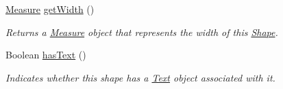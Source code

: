 \begin{DoxyCompactItemize}
\hyperlink{classcom_1_1aarrelaakso_1_1drawl_1_1_measure}{Measure} \hyperlink{classcom_1_1aarrelaakso_1_1drawl_1_1_shape_a3e2c58984f1bcbc2e9e86cf30868561e}{get\+Width} ()
\begin{DoxyCompactList}\small\item\em Returns a \hyperlink{classcom_1_1aarrelaakso_1_1drawl_1_1_measure}{Measure} object that represents the width of this \hyperlink{classcom_1_1aarrelaakso_1_1drawl_1_1_shape}{Shape}. \end{DoxyCompactList}\item 
Boolean \hyperlink{classcom_1_1aarrelaakso_1_1drawl_1_1_shape_a037a5515b2a6e1df1d1981aa5516e78e}{has\+Text} ()
\begin{DoxyCompactList}\small\item\em Indicates whether this shape has a \hyperlink{classcom_1_1aarrelaakso_1_1drawl_1_1_text}{Text} object associated with it. \end{DoxyCompactList}\end{DoxyCompactItemize}
